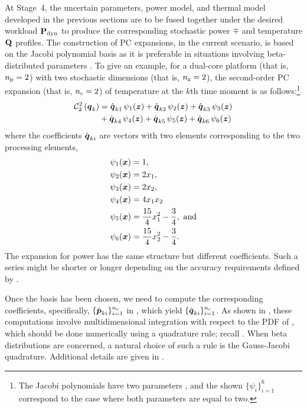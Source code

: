 At Stage~4, the uncertain parameters, power model, and thermal model developed
in the previous sections are to be fused together under the desired workload
$\mathbf{P}_{\mathrm{dyn}}$ to produce the corresponding stochastic power $\mp$ and
temperature $\mathbf{Q}$ profiles. The construction of PC expansions, in the current
scenario, is based on the Jacobi polynomial basis as it is preferable in
situations involving beta-distributed parameters \cite{xiu2010}. To give an
example, for a dual-core platform (that is, ${n_\mathrm{p}} = 2$) with two stochastic
dimensions (that is, ${n_\mathrm{z}} = 2$), the second-order PC expansion (that is, ${n_\mathrm{c}} =
2$) of temperature at the $k$th time moment is as follows:\footnote{The Jacobi
polynomials have two parameters \cite{xiu2010}, and the shown $\{ \psi_i \}_{i =
1}^6$ correspond to the case where both parameters are equal to two.}
\begin{align}
  \chaos{2}{2}{\vq_k}
  & = \hat{\vq}_{k1} \, \psi_1(\vz) + \hat{\vq}_{k2} \, \psi_2(\vz) + \hat{\vq}_{k3} \, \psi_3(\vz) \nonumber \\
  & {} + \hat{\vq}_{k4} \, \psi_4(\vz) + \hat{\vq}_{k5} \, \psi_5(\vz) + \hat{\vq}_{k6} \, \psi_6(\vz) \elab{pc-example}
\end{align}
where the coefficients $\hat{\boldsymbol{q}}_{ki}$ are vectors with two elements
corresponding to the two processing elements,
\begin{align*}
  & \psi_1(\boldsymbol{x}) = 1, \\
  & \psi_2(\boldsymbol{x}) = 2 x_1, \\
  & \psi_3(\boldsymbol{x}) = 2 x_2, \\
  & \psi_4(\boldsymbol{x}) = 4 x_1 x_2 \\
  & \psi_5(\boldsymbol{x}) = \frac{15}{4} x_1^2 - \frac{3}{4}, \text{ and} \\
  & \psi_6(\boldsymbol{x}) = \frac{15}{4} x_2^2 - \frac{3}{4}.
\end{align*}
The expansion for power has the same structure but different coefficients. Such
a series might be shorter or longer depending on the accuracy requirements
defined by \lc.

Once the basis has been chosen, we need to compute the corresponding
coefficients, specifically, $\{ \hat{\boldsymbol{p}}_{ki} \}_{i = 1}^{n_\mathrm{c}}$ in
, which yield $\{ \hat{\boldsymbol{q}}_{ki} \}_{i = 1}^{n_\mathrm{c}}$. As shown in
, these computations involve multidimensional integration
with respect to the PDF of \vz, which should be done numerically using a
quadrature rule; recall . When beta distributions are
concerned, a natural choice of such a rule is the Gauss-Jacobi quadrature.
Additional details are given in .

